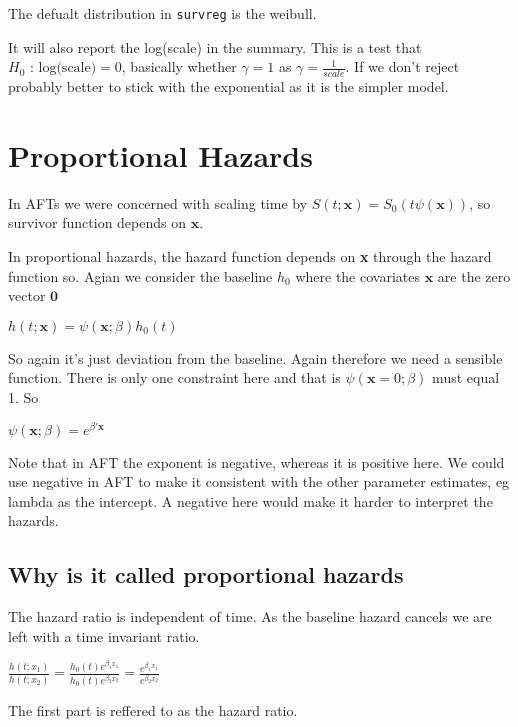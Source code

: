 \documentclass[
  letterpaper,
  DIV=11,
  numbers=noendperiod]{scrreprt}
\begin{document}
The defualt distribution in \texttt{survreg} is the weibull.

It will also report the log(scale) in the summary. This is a test that
\(H_0 \text{ : log(scale)} = 0\), basically whether \(\gamma = 1\) as
\(\gamma = \frac{1}{scale}\). If we don't reject probably better to
stick with the exponential as it is the simpler model.

\hypertarget{proportional-hazards}{%
\section{Proportional Hazards}\label{proportional-hazards}}

In AFTs we were concerned with scaling time by
\(S(t;\textbf{x}) = S_0(t\psi(\textbf{x}))\), so survivor function
depends on \(\textbf{x}\).

In proportional hazards, the hazard function depends on \textbf{x}
through the hazard function so. Agian we consider the baseline \(h_0\)
where the covariates \(\textbf{x}\) are the zero vector \(\textbf{0}\)

\(h(t;\textbf{x}) = \psi(\textbf{x};\beta) h_0(t)\)

So again it's just deviation from the baseline. Again therefore we need
a sensible function. There is only one constraint here and that is
\(\psi(\textbf{x}=0;\beta)\) must equal 1. So

\(\psi(\textbf{x};\beta) = e^{\beta'\textbf{x}}\)

Note that in AFT the exponent is negative, whereas it is positive here.
We could use negative in AFT to make it consistent with the other
parameter estimates, eg lambda as the intercept. A negative here would
make it harder to interpret the hazards.

\hypertarget{why-is-it-called-proportional-hazards}{%
\subsection{Why is it called proportional
hazards}\label{why-is-it-called-proportional-hazards}}

The hazard ratio is independent of time. As the baseline hazard cancels
we are left with a time invariant ratio.

\(\frac{h(t;x_1)}{h(t;x_2)} = \frac{h_0(t)e^{\beta_1 x_1}}{h_0(t)e^{\beta_2 x_2}} = \frac{e^{\beta_1 x_1}}{e^{\beta_2 x_2}}\)

The first part is reffered to as the hazard ratio.
\end{document}
